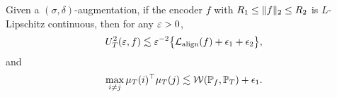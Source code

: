 
\begin{lemma}
\label{lemma: the effect of minimaxing our loss}
Given a $(\sigma, \delta)$-augmentation, if the encoder $f$ with $R_1 \leq \norm{f}_2 \leq R_2$ is $L$-Lipschitz continuous, then for any $\eps > 0$,
\begin{align}\label{eq: U_T < L}
U_T^2(\eps, f) \lesssim \eps^{-2}\big\{\mathcal{L}_{\mathrm{align}}(f) + \epsilon_1 + \epsilon_2\big\},
\end{align}
and
\begin{align}\label{eq: downstream divergence ≤ W + ɛ}
\max_{i \neq j}\mu_T(i)^\top\mu_T(j) \lesssim \mathcal{W}(\P_f, \P_T) + \epsilon_1.
\end{align}
\end{lemma}

